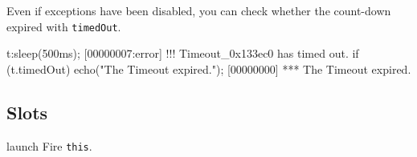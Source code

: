 
Even if exceptions have been disabled, you can check whether the
count-down expired with \lstinline|timedOut|.

\begin{urbiscript}
t:sleep(500ms);
[00000007:error] !!! Timeout_0x133ec0 has timed out.
if (t.timedOut)
  echo("The Timeout expired.");
[00000000] *** The Timeout expired.
\end{urbiscript}

\subsection{Slots}
\begin{urbiscriptapi}
\item[launch]
  Fire \lstinline|this|.

\end{urbiscriptapi}

